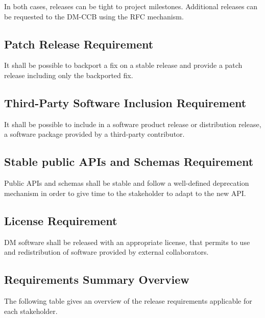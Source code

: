 In both cases, releases can be tight to project milestones.
Additional releases can be requested to the DM-CCB using the RFC mechanism.


\subsection{Patch Release Requirement} \label{sec:backport}

It shall be possible to backport a fix on a stable release and provide a patch release including only the backported fix.


\subsection{Third-Party Software Inclusion Requirement} \label{sec:thirdsw}

It shall be possible to include in a software product release or distribution release, a software package provided by a third-party contributor.


\subsection{Stable public APIs and Schemas Requirement} \label{sec:stable}

Public APIs and schemas shall be stable and follow a well-defined deprecation mechanism in order to give time to the stakeholder to adapt to the new API.


\subsection{License Requirement} \label{sec:license}

DM software shall be released with an appropriate license, that permits to use and redistribution of software provided by external collaborators.


\subsection{Requirements Summary Overview} \label{sec:overview}

The following table gives an overview of the release requirements applicable for each stakeholder.

